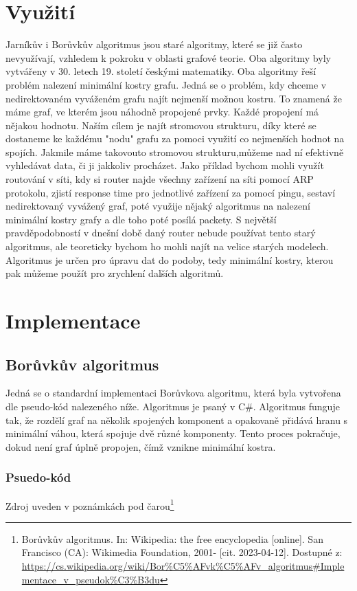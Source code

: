 \documentclass[11pt]{article}
\begin{document}
\section{Využití}
Jarníkův i Borůvkův algoritmus jsou staré algoritmy, které se již často nevyužívají, vzhledem k pokroku v oblasti grafové teorie. Oba algoritmy byly vytvářeny v 30. letech 19. století českými matematiky. Oba algoritmy řeší problém nalezení minimální kostry grafu. Jedná se o problém, kdy chceme v nedirektovaném vyváženém grafu najít nejmenší možnou kostru. To znamená že máme graf, ve kterém jsou náhodně propojené prvky. Každé propojení má nějakou hodnotu. Naším cílem je najít stromovou strukturu, díky které se dostaneme ke každému "nodu" grafu za pomoci využití co nejmenších hodnot na spojích. Jakmile máme takovouto stromovou strukturu,můžeme nad ní efektivně vyhledávat data, či ji jakkoliv procházet. Jako příklad bychom mohli využít routování v síti, kdy si router najde všechny zařízení na síti pomocí ARP protokolu, zjistí response time pro jednotlivé zařízení za pomocí pingu, sestaví nedirektovaný vyvážený graf, poté využije nějaký algoritmus na nalezení minimální kostry grafy a dle toho poté posílá packety. S největší pravděpodobností v dnešní době daný router nebude používat tento starý algoritmus, ale teoreticky bychom ho mohli najít na velice starých modelech. Algoritmus je určen pro úpravu dat do podoby, tedy minimální kostry, kterou pak můžeme použít pro zrychlení dalších algoritmů.

\pagebreak

\section{Implementace}

\subsection{Borůvkův algoritmus}
Jedná se o standardní implementaci Borůvkova algoritmu, která byla vytvořena dle pseudo-kód nalezeného níže. Algoritmus je psaný v C\#.
Algoritmus funguje tak, že rozdělí graf na několik spojených komponent a opakovaně přidává hranu s minimální váhou, která spojuje dvě různé komponenty. Tento proces pokračuje, dokud není graf úplně propojen, čímž vznikne minimální kostra.

\subsubsection{Psuedo-kód}
Zdroj uveden v poznámkách pod čarou\footnote{Borůvkův algoritmus. In: Wikipedia: the free encyclopedia [online]. San Francisco (CA): Wikimedia Foundation, 2001- [cit. 2023-04-12]. Dostupné z: \url{https://cs.wikipedia.org/wiki/Bor\%C5\%AFvk\%C5\%AFv_algoritmus\#Implementace_v_pseudok\%C3\%B3du}}
\end{document}
